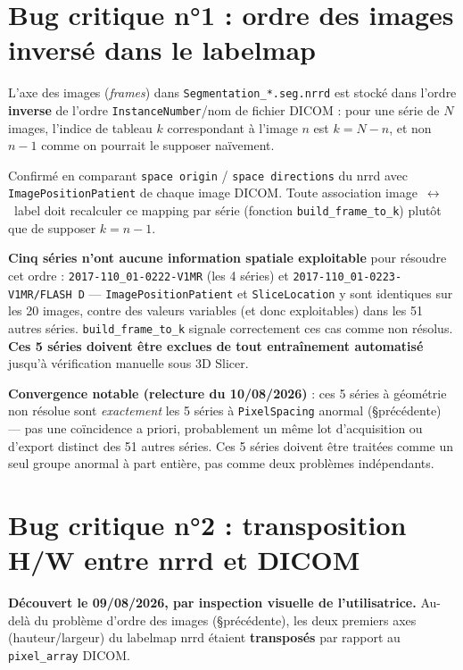 \section{Bug critique n°1 : ordre des images inversé dans le labelmap}
\label{sec:bug-ordre-frames}

L'axe des images (\emph{frames}) dans \texttt{Segmentation\_*.seg.nrrd} est stocké dans l'ordre
\textbf{inverse} de l'ordre \texttt{InstanceNumber}/nom de fichier DICOM : pour une série de $N$
images, l'indice de tableau $k$ correspondant à l'image $n$ est $k = N - n$, et non $n - 1$ comme on
pourrait le supposer naïvement.

Confirmé en comparant \texttt{space origin} / \texttt{space directions} du nrrd avec
\texttt{ImagePositionPatient} de chaque image DICOM. Toute association image~$\leftrightarrow$~label
doit recalculer ce mapping par série (fonction \texttt{build\_frame\_to\_k}) plutôt que de supposer
$k = n-1$.

\textbf{Cinq séries n'ont aucune information spatiale exploitable} pour résoudre cet ordre :
\texttt{2017-110\_01-0222-V1MR} (les 4 séries) et \texttt{2017-110\_01-0223-V1MR/FLASH D} ---
\texttt{ImagePositionPatient} et \texttt{SliceLocation} y sont identiques sur les 20 images, contre
des valeurs variables (et donc exploitables) dans les 51 autres séries. \texttt{build\_frame\_to\_k}
signale correctement ces cas comme non résolus. \textbf{Ces 5 séries doivent être exclues de tout
entraînement automatisé} jusqu'à vérification manuelle sous 3D Slicer.

\textbf{Convergence notable (relecture du 10/08/2026)} : ces 5 séries à géométrie non résolue sont
\emph{exactement} les 5 séries à \texttt{PixelSpacing} anormal (\S précédente) --- pas une coïncidence
a priori, probablement un même lot d'acquisition ou d'export distinct des 51 autres séries. Ces 5
séries doivent être traitées comme un seul groupe anormal à part entière, pas comme deux problèmes
indépendants.

\section{Bug critique n°2 : transposition H/W entre nrrd et DICOM}
\label{sec:bug-transposition}

\textbf{Découvert le 09/08/2026, par inspection visuelle de l'utilisatrice.} Au-delà du problème
d'ordre des images (\S précédente), les deux premiers axes (hauteur/largeur) du labelmap nrrd étaient
\textbf{transposés} par rapport au \texttt{pixel\_array} DICOM.

